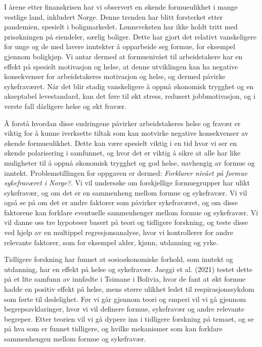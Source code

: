 \documentclass[
  11pt,
  a4paper,
  DIV=11,
  numbers=noendperiod]{scrartcl}
\begin{document}
I årene etter finanskrisen har vi observert en økende formueulikhet i
mange vestlige land, inkludert Norge. Denne trenden har blitt forsterket
etter pandemien, spesielt i boligmarkedet. Lønnsveksten har ikke holdt
tritt med prisøkningen på eiendeler, særlig boliger. Dette har gjort det
relativt vanskeligere for unge og de med lavere inntekter å opparbeide
seg formue, for eksempel gjennom boligkjøp. Vi antar dermed at
formuenivået til arbeidstakere har en effekt på spesielt motivasjon og
helse, at denne utviklingen kan ha negative konsekvenser for
arbeidstakeres motivasjon og helse, og dermed påvirke sykefraværet. Når
det blir stadig vanskeligere å oppnå økonomisk trygghet og en akseptabel
levestandard, kan det føre til økt stress, redusert jobbmotivasjon, og i
verste fall dårligere helse og økt fravær.

Å forstå hvordan disse endringene påvirker arbeidstakeres helse og
fravær er viktig for å kunne iverksette tiltak som kan motvirke negative
konsekvenser av økende formueulikhet. Dette kan være spesielt viktig i
en tid hvor vi ser en økende polarisering i samfunnet, og hvor det er
viktig å sikre at alle har like muligheter til å oppnå økonomisk
trygghet og god helse, uavhengig av formue og inntekt. Problemstillingen
for oppgaven er dermed: \emph{Forklarer nivået på formue sykefraværet i
Norge?}. Vi vil undersøke om forskjellige formuegrupper har ulikt
sykefravær, og om det er en sammenheng mellom formue og sykefravær. Vi
vil også se på om det er andre faktorer som påvirker sykefraværet, og om
disse faktorene kan forklare eventuelle sammenhenger mellom formue og
sykefravær. Vi vil danne oss tre hypoteser basert på teori og tidligere
forskning, og teste disse ved hjelp av en multippel regresjonsanalyse,
hvor vi kontrollerer for andre relevante faktorer, som for eksempel
alder, kjønn, utdanning og yrke.

Tidligere forskning har funnet at sosioøkonomiske forhold, som inntekt
og utdanning, har en effekt på helse og sykefravær. Jaeggi et al. (2021)
testet dette på et lite samfunn av innfødte i Tsimane i Bolivia, hvor de
fant at økt formue hadde en positiv effekt på helse, mens større ulikhet
ledet til respirasjonssykdom som førte til dødelighet. Før vi går
gjennom teori og emperi vil vi gå gjennom begrepsavklaringer, hvor vi
vil definere formue, sykefravær og andre relevante begreper. Etter
teorien vil vi gå dypere inn i tidligere forskning på temaet, og se på
hva som er funnet tidligere, og hvilke mekanismer som kan forklare
sammenhengen mellom formue og sykefravær.
\end{document}
